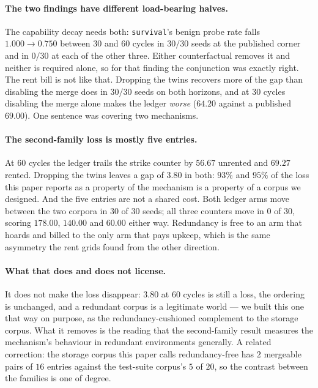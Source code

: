 \paragraph{The two findings have different load-bearing halves.} The
capability decay needs both: \texttt{survival}'s benign probe rate falls
$1.000 \rightarrow 0.750$ between 30 and 60 cycles in $30/30$ seeds at
the published corner and in $0/30$ at each of the other three. Either
counterfactual removes it and neither is required alone, so for that
finding the conjunction was exactly right. The rent bill is not like
that. Dropping the twins recovers more of the gap than disabling the
merge does in $30/30$ seeds on both horizons, and at 30 cycles disabling
the merge alone makes the ledger \emph{worse} ($64.20$ against a
published $69.00$). One sentence was covering two mechanisms.

\paragraph{The second-family loss is mostly five entries.} At 60 cycles
the ledger trails the strike counter by $56.67$ unrented and $69.27$
rented. Dropping the twins leaves a gap of $3.80$ in both:
$93\%$ and $95\%$ of the loss this paper reports as a property of the
mechanism is a property of a corpus we designed. And the five entries
are not a shared cost. Both ledger arms move between the two corpora in
$30$ of $30$ seeds; all three counters move in $0$ of $30$, scoring
$178.00$, $140.00$ and $60.00$ either way. Redundancy is
free to an arm that hoards and billed to the only arm that pays upkeep,
which is the same asymmetry the rent grids found from the other
direction.

\paragraph{What that does and does not license.} It does not make the
loss disappear: $3.80$ at 60 cycles is still a loss, the ordering is
unchanged, and a redundant corpus is a legitimate world --- we built this
one that way on purpose, as the redundancy-cushioned complement to the
storage corpus. What it removes is the reading that the second-family
result measures the mechanism's behaviour in redundant environments
generally. A related correction: the storage corpus this paper calls
redundancy-free has $2$ mergeable pairs of $16$ entries against the
test-suite corpus's $5$ of $20$, so the contrast between the families is
one of degree.

